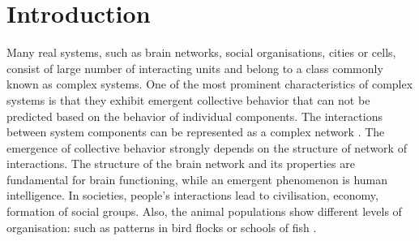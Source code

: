 \chapter{Introduction} %

Many real systems, such as brain networks, social organisations, cities or cells, consist of large number of interacting units and belong to a class commonly known as complex systems. One of the most prominent characteristics of complex systems is that they exhibit emergent collective behavior that can not be predicted based on the behavior of individual components. The interactions between system components can be represented as a complex network \cite{kwapien2012}. The emergence of collective behavior strongly depends on the structure of network of interactions. The structure of the brain network and its properties are fundamental for brain functioning, while an emergent phenomenon is human intelligence. In societies, people's interactions lead to civilisation, economy, formation of social groups. Also, the animal populations show different levels of organisation: such as patterns in bird flocks or schools of fish \cite{thurner2018}.





